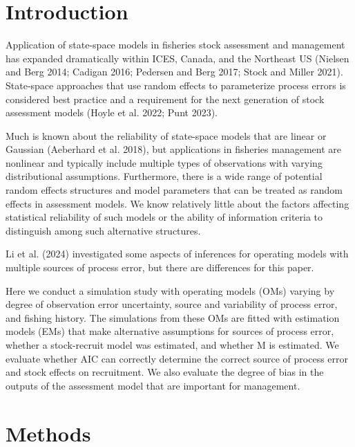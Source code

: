\documentclass[
  12pt,
]{article}
\begin{document}
\pagebreak

\pagebreak

\hypertarget{introduction}{%
\section*{Introduction}\label{introduction}}

Application of state-space models in fisheries stock assessment and
management has expanded dramatically within ICES, Canada, and the
Northeast US (Nielsen and Berg 2014; Cadigan 2016; Pedersen and Berg
2017; Stock and Miller 2021). State-space approaches that use random
effects to parameterize process errors is considered best practice and a
requirement for the next generation of stock assessment models (Hoyle et
al. 2022; Punt 2023).

Much is known about the reliability of state-space models that are
linear or Gaussian (Aeberhard et al. 2018), but applications in
fisheries management are nonlinear and typically include multiple types
of observations with varying distributional assumptions. Furthermore,
there is a wide range of potential random effects structures and model
parameters that can be treated as random effects in assessment models.
We know relatively little about the factors affecting statistical
reliability of such models or the ability of information criteria to
distinguish among such alternative structures.

Li et al. (2024) investigated some aspects of inferences for operating
models with multiple sources of process error, but there are differences
for this paper.

Here we conduct a simulation study with operating models (OMs) varying
by degree of observation error uncertainty, source and variability of
process error, and fishing history. The simulations from these OMs are
fitted with estimation models (EMs) that make alternative assumptions
for sources of process error, whether a stock-recruit model was
estimated, and whether M is estimated. We evaluate whether AIC can
correctly determine the correct source of process error and stock
effects on recruitment. We also evaluate the degree of bias in the
outputs of the assessment model that are important for management.

\hypertarget{methods}{%
\section*{Methods}\label{methods}}
\end{document}

